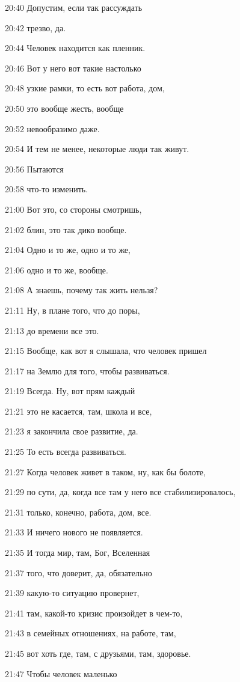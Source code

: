 20:40
Допустим, если так рассуждать

20:42
трезво, да.

20:44
Человек находится как пленник.

20:46
Вот у него вот такие настолько

20:48
узкие рамки, то есть вот работа, дом,

20:50
это вообще жесть, вообще

20:52
невообразимо даже.

20:54
И тем не менее, некоторые люди так живут.

20:56
Пытаются

20:58
что-то изменить.

21:00
Вот это, со стороны смотришь,

21:02
блин, это так дико вообще.

21:04
Одно и то же, одно и то же,

21:06
одно и то же, вообще.

21:08
А знаешь, почему так жить нельзя?

21:11
Ну, в плане того, что до поры,

21:13
до времени все это.

21:15
Вообще, как вот я слышала, что человек пришел

21:17
на Землю для того, чтобы развиваться.

21:19
Всегда. Ну, вот прям каждый

21:21
это не касается, там, школа и все,

21:23
я закончила свое развитие, да.

21:25
То есть всегда развиваться.

21:27
Когда человек живет в таком, ну, как бы болоте,

21:29
по сути, да, когда все там у него все стабилизировалось,

21:31
только, конечно, работа, дом, все.

21:33
И ничего нового не появляется.

21:35
И тогда мир, там, Бог, Вселенная

21:37
того, что доверит, да, обязательно

21:39
какую-то ситуацию провернет,

21:41
там, какой-то кризис произойдет в чем-то,

21:43
в семейных отношениях, на работе, там,

21:45
вот хоть где, там, с друзьями, там, здоровье.

21:47
Чтобы человек маленько

